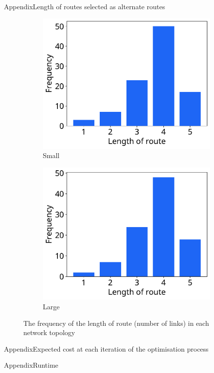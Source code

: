 \begin{frame}{Appendix}{Length of routes selected as alternate routes}
\begin{figure}[!htbp]
	\centering
	\begin{subfigure}{0.49\textwidth}
	\includegraphics[width=\textwidth]{pictures/plots/topology/route_freq_small.pdf}
	\caption{Small}
	\end{subfigure}
	\begin{subfigure}{0.49\textwidth}
	\includegraphics[width=\textwidth]{pictures/plots/topology/route_freq_large.pdf}
	\caption{Large}
	\end{subfigure}
	\caption{The frequency of the length of route (number of links) in each network topology}
	\label{fig:toynetworksroutefreq}
\end{figure}

\end{frame}

\begin{frame}{Appendix}{Expected cost at each iteration of the optimisation process}

\end{frame}
\begin{frame}{Appendix}{Runtime}

\end{frame}
